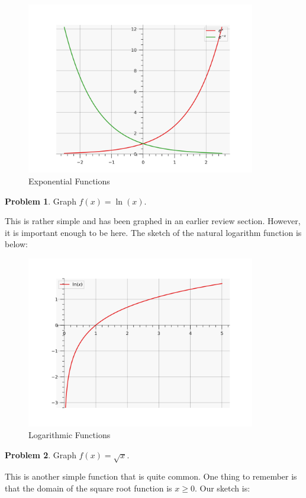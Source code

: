 \documentclass[12pt]{article}
\theoremstyle{definition}
\newtheorem{problem}{Problem}
\begin{document}
\begin{figure}[H]
    \centering
    \includegraphics[width=10cm, keepaspectratio]{graph_8.png}
    \caption{Exponential Functions}
    \label{fig:fig8}
\end{figure}

\begin{problem}
Graph $f(x)=\ln(x)$.
\end{problem}

This is rather simple and has been graphed in an earlier review section.
However, it is important enough to be here.
The sketch of the natural logarithm function is below:

\begin{figure}[H]
    \centering
    \includegraphics[width=10cm, keepaspectratio]{graph_9.png}
    \caption{Logarithmic Functions}
    \label{fig:fig9}
\end{figure}

\begin{problem}
Graph $f(x)=\sqrt{x}$.
\end{problem}

This is another simple function that is quite common.
One thing to remember is that the domain of the square root function is $x\geq 0$.
Our sketch is:
\end{document}
